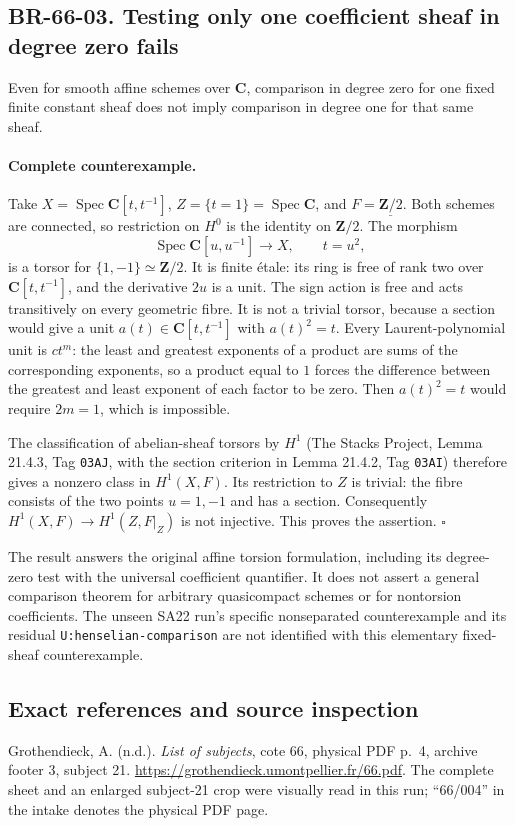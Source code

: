 \documentclass[11pt,a4paper]{article}
\theoremstyle{definition}\newtheorem{definition}[theorem]{Definition}
\theoremstyle{remark}\newtheorem{remark}[theorem]{Remark}
\begin{document}
\subsection{BR-66-03. Testing only one coefficient sheaf in degree zero fails}
Even for smooth affine schemes over $\mathbf C$, comparison in degree
zero for one fixed finite constant sheaf does not imply comparison
in degree one for that same sheaf.

\paragraph{Complete counterexample.}
Take $X=\operatorname{Spec}\mathbf C[t,t^{-1}]$,
$Z=\{t=1\}=\operatorname{Spec}\mathbf C$, and
$F=\underline{\mathbf Z/2}$. Both schemes are connected, so
restriction on $H^0$ is the identity on $\mathbf Z/2$.
The morphism
\[
 \operatorname{Spec}\mathbf C[u,u^{-1}]\longrightarrow X,
 \qquad t=u^2,
\]
is a torsor for $\{1,-1\}\simeq\mathbf Z/2$. It is finite \'etale:
its ring is free of rank two over $\mathbf C[t,t^{-1}]$, and the
derivative $2u$ is a unit. The sign action is free and acts transitively
on every geometric fibre. It is not a trivial torsor, because a section
would give a unit $a(t)\in\mathbf C[t,t^{-1}]$ with $a(t)^2=t$.
Every Laurent-polynomial unit is $ct^m$: the least and greatest
exponents of a product are sums of the corresponding exponents,
so a product equal to $1$ forces the difference between the greatest
and least exponent of each factor to be zero. Then $a(t)^2=t$
would require $2m=1$, which is impossible.

The classification of abelian-sheaf torsors by $H^1$ (The Stacks
Project, Lemma 21.4.3, Tag \nolinkurl{03AJ}, with the section criterion
in Lemma 21.4.2, Tag \nolinkurl{03AI}) therefore gives
a nonzero class in $H^1(X,F)$. Its restriction to $Z$ is trivial:
the fibre consists of the two points $u=1,-1$ and has a section.
Consequently $H^1(X,F)\to H^1(Z,F|_Z)$ is not injective.
This proves the assertion. \(\square\)

The result answers the original affine torsion formulation, including
its degree-zero test with the universal coefficient quantifier.
It does not assert a general comparison theorem for arbitrary
quasicompact schemes or for nontorsion coefficients. The unseen
SA22 run's specific nonseparated counterexample and its residual
\texttt{U:henselian-comparison} are not identified with this elementary
fixed-sheaf counterexample.

\subsection*{Exact references and source inspection}
Grothendieck, A. (n.d.). \emph{List of subjects}, cote 66,
physical PDF p.~4, archive footer 3, subject 21.
\url{https://grothendieck.umontpellier.fr/66.pdf}.
The complete sheet and an enlarged subject-21 crop were visually read
in this run; ``66/004'' in the intake denotes the physical PDF page.
\end{document}
